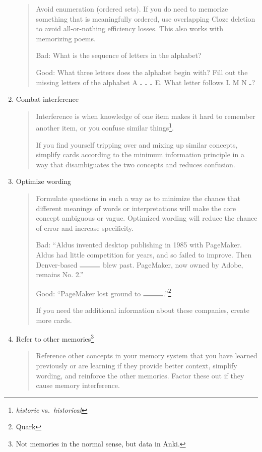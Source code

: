 \documentclass[]{tufte-handout}
\begin{document}
\begin{enumerate}
\begin{quote}
Avoid enumeration (ordered sets). If you do need to memorize something that is meaningfully ordered, use overlapping Cloze deletion to avoid all-or-nothing efficiency losses. This also works with memorizing poems.

Bad: What is the sequence of letters in the alphabet?

Good: What three letters does the alphabet begin with? Fill out the missing letters of the alphabet A $\rule{0.1cm}{0.15mm}$ $\rule{0.1cm}{0.15mm}$ $\rule{0.1cm}{0.15mm}$ E. What letter follows L M N $\rule{0.1cm}{0.15mm}$?
\end{quote}

\item{Combat interference}

\begin{quote}
Interference is when knowledge of one item makes it hard to remember another item, or you confuse similar things\footnote{\textit{historic} vs.\ \textit{historical}}.

If you find yourself tripping over and mixing up similar concepts, simplify cards according to the minimum information principle in a way that disambiguates the two concepts and reduces confusion.
\end{quote}

\item{Optimize wording}

\begin{quote}
Formulate questions in such a way as to minimize the chance that different meanings of words or interpretations will make the core concept ambiguous or vague. Optimized wording will reduce the chance of error and increase specificity.

Bad: ``Aldus invented desktop publishing in 1985 with PageMaker. Aldus had little competition for years, and so failed to improve. Then Denver-based $\rule{1cm}{0.15mm}$ blew past. PageMaker, now owned by Adobe, remains No. 2.''

Good: ``PageMaker lost ground to $\rule{1cm}{0.15mm}$.''\footnote{Quark}

If you need the additional information about these companies, create more cards.
\end{quote}

\newpage

\item{Refer to other memories\footnote{Not memories in the normal sense, but data in Anki.}}

\begin{quote}
Reference other concepts in your memory system that you have learned previously or are learning if they provide better context, simplify wording, and reinforce the other memories. Factor these out if they cause memory interference.
\end{quote}


\end{enumerate}
\end{document}
